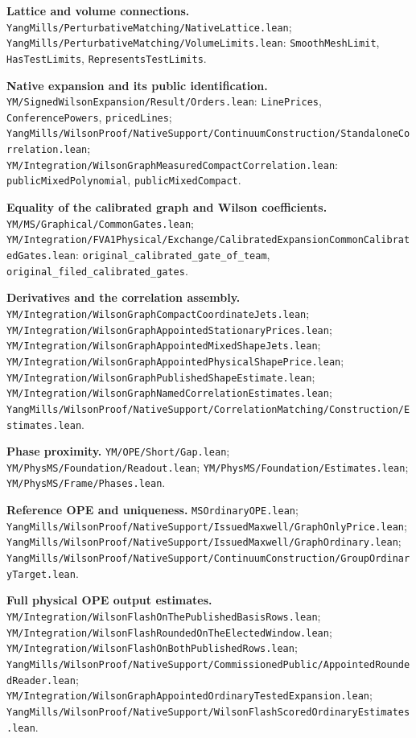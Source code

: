 \documentclass[11pt]{article}
\newcommand{\code}[1]{{\small\nolinkurl{#1}}}
\newcommand{\src}[1]{\textsf{[#1]}}
\begin{document}
\begin{description}[leftmargin=3em,labelwidth=2.6em,align=left]
\item[\src{V}] \textbf{Lattice and volume connections.}
\code{YangMills/PerturbativeMatching/NativeLattice.lean};
\code{YangMills/PerturbativeMatching/VolumeLimits.lean}:
\code{SmoothMeshLimit}, \code{HasTestLimits}, \code{RepresentsTestLimits}.

\item[\src{P}] \textbf{Native expansion and its public identification.}
\code{YM/SignedWilsonExpansion/Result/Orders.lean}:
\code{LinePrices}, \code{ConferencePowers}, \code{pricedLines};
\code{YangMills/WilsonProof/NativeSupport/ContinuumConstruction/StandaloneCorrelation.lean};
\code{YM/Integration/WilsonGraphMeasuredCompactCorrelation.lean}:
\code{publicMixedPolynomial}, \code{publicMixedCompact}.

\item[\src{E}] \textbf{Equality of the calibrated graph and Wilson coefficients.}
\code{YM/MS/Graphical/CommonGates.lean};
\code{YM/Integration/FVA1Physical/Exchange/CalibratedExpansionCommonCalibratedGates.lean}:
\code{original_calibrated_gate_of_team},
\code{original_filed_calibrated_gates}.

\item[\src{J}] \textbf{Derivatives and the correlation assembly.}
\code{YM/Integration/WilsonGraphCompactCoordinateJets.lean};
\code{YM/Integration/WilsonGraphAppointedStationaryPrices.lean};
\code{YM/Integration/WilsonGraphAppointedMixedShapeJets.lean};
\code{YM/Integration/WilsonGraphAppointedPhysicalShapePrice.lean};
\code{YM/Integration/WilsonGraphPublishedShapeEstimate.lean};
\code{YM/Integration/WilsonGraphNamedCorrelationEstimates.lean};
\code{YangMills/WilsonProof/NativeSupport/CorrelationMatching/Construction/Estimates.lean}.

\item[\src{H}] \textbf{Phase proximity.}
\code{YM/OPE/Short/Gap.lean};
\code{YM/PhysMS/Foundation/Readout.lean};
\code{YM/PhysMS/Foundation/Estimates.lean};
\code{YM/PhysMS/Frame/Phases.lean}.

\item[\src{O}] \textbf{Reference OPE and uniqueness.}
\code{MSOrdinaryOPE.lean};
\code{YangMills/WilsonProof/NativeSupport/IssuedMaxwell/GraphOnlyPrice.lean};
\code{YangMills/WilsonProof/NativeSupport/IssuedMaxwell/GraphOrdinary.lean};
\code{YangMills/WilsonProof/NativeSupport/ContinuumConstruction/GroupOrdinaryTarget.lean}.

\item[\src{Q}] \textbf{Full physical OPE output estimates.}
\code{YM/Integration/WilsonFlashOnThePublishedBasisRows.lean};
\code{YM/Integration/WilsonFlashRoundedOnTheElectedWindow.lean};
\code{YM/Integration/WilsonFlashOnBothPublishedRows.lean};
\code{YangMills/WilsonProof/NativeSupport/CommissionedPublic/AppointedRoundedReader.lean};
\code{YM/Integration/WilsonGraphAppointedOrdinaryTestedExpansion.lean};
\code{YangMills/WilsonProof/NativeSupport/WilsonFlashScoredOrdinaryEstimates.lean}.


\end{description}
\end{document}
